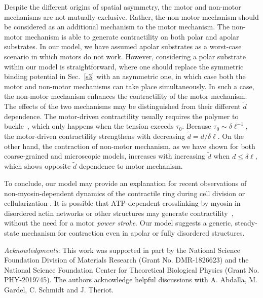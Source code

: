 \documentclass[twocolumn,prl,english]{revtex4-1}
\begin{document}
Despite the different origins of spatial asymmetry, the motor and non-motor mechanisms are not mutually exclusive. Rather, the non-motor mechanism should be considered as an additional mechanism to the motor mechanism. The non-motor mechanism is able to generate contractility on both polar and apolar substrates. In our model, we have assumed apolar substrates as a worst-case scenario in which motors do not work. However, considering a polar substrate within our model is straightforward, where one should replace the symmetric binding potential in  Sec.~\ref{s3} with an asymmetric one, in which case both the motor and non-motor mechanisms can take place simultaneously. In such a case, the non-motor mechanism enhances the contractility of the motor mechanism. The effects of the two mechanisms may be distinguished from their different $\tilde d$ dependence. The motor-driven contractility usually requires the polymer to buckle~\cite{Silva2011,Lenz2012}, which only happens when the tension exceeds $\tau_0$. Because $\tau_0\sim \delta \ell^{-1}$, the motor-driven contractility strengthens with decreasing $\tilde d=d/\delta \ell$. On the other hand, the contraction of non-motor mechanism, as we have shown for both coarse-grained and microscopic models, increases with increasing $\tilde d$ when $d\leq\delta \ell$, which shows opposite $\tilde d$-dependence to motor mechanism. 



To conclude, our model may provide an explanation for recent observations of non-myosin-dependent dynamics of the contractile ring during cell division or cellularization \cite{Wloka2013, Xue2016}.
It is possible that ATP-dependent crosslinking by myosin in disordered actin networks or other structures may generate contractility~\cite{Ramaswamy2004,Shen2006,Wang2011,Silva2011,Alvarado2013,Tjhung2013,Markovich2019}, 
without the need for a motor \emph{power stroke}. 
Our model suggests a generic, steady-state mechanism for contraction even in apolar or fully disordered structures. 

\begin{acknowledgements}
	\emph{Acknowledgments}:
	This work was supported in part by the National
	Science Foundation Division of Materials Research
	(Grant No. DMR-1826623) and the National Science
	Foundation Center for Theoretical Biological Physics
	(Grant No. PHY-2019745). The authors acknowledge helpful discussions with A. Abdalla, M. Gardel, C. Schmidt and J. Theriot. 
\end{acknowledgements} 
\end{document}
